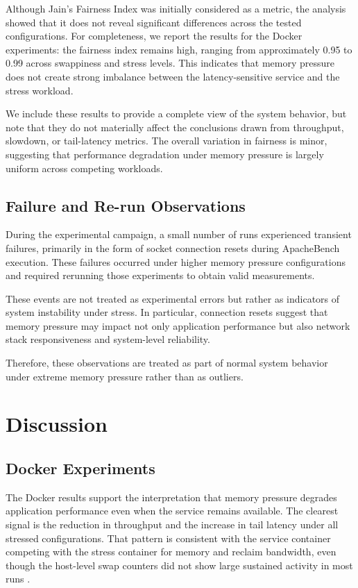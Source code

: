 \documentclass[conference]{IEEEtran}
\begin{document}
Although Jain’s Fairness Index was initially considered as a metric, the analysis showed that it does not reveal significant differences across the tested configurations. For completeness, we report the results for the Docker experiments: the fairness index remains high, ranging from approximately 0.95 to 0.99 across swappiness and stress levels. This indicates that memory pressure does not create strong imbalance between the latency-sensitive service and the stress workload.

We include these results to provide a complete view of the system behavior, but note that they do not materially affect the conclusions drawn from throughput, slowdown, or tail-latency metrics. The overall variation in fairness is minor, suggesting that performance degradation under memory pressure is largely uniform across competing workloads.

\subsection{Failure and Re-run Observations}

During the experimental campaign, a small number of runs experienced transient failures, primarily in the form of socket connection resets during ApacheBench execution. These failures occurred under higher memory pressure configurations and required rerunning those experiments to obtain valid measurements.

These events are not treated as experimental errors but rather as indicators of system instability under stress. In particular, connection resets suggest that memory pressure may impact not only application performance but also network stack responsiveness and system-level reliability.

Therefore, these observations are treated as part of normal system behavior under extreme memory pressure rather than as outliers.

\section{Discussion}

\subsection{Docker Experiments}

The Docker results support the interpretation that memory pressure degrades application performance even when the service remains available. The clearest signal is the reduction in throughput and the increase in tail latency under all stressed configurations. That pattern is consistent with the service container competing with the stress container for memory and reclaim bandwidth, even though the host-level swap counters did not show large sustained activity in most runs \cite{nakazawa2017taming}.
\end{document}
